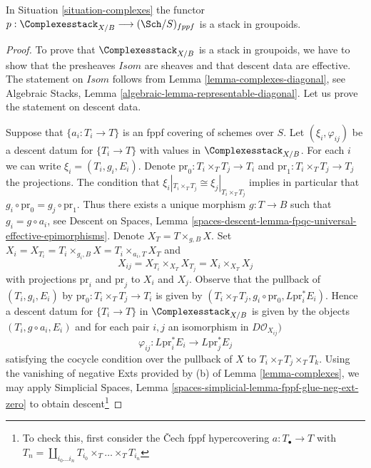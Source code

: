 \begin{lemma}
\label{lemma-complexes-stack}
In Situation \ref{situation-complexes} the functor
$p : \Complexesstack_{X/B} \longrightarrow (\Sch/S)_{fppf}$
is a stack in groupoids.
\end{lemma}

\begin{proof}
To prove that $\Complexesstack_{X/B}$ is a stack in groupoids,
we have to show that the presheaves $\mathit{Isom}$ are sheaves
and that descent data are effective. The statement on
$\mathit{Isom}$ follows from Lemma \ref{lemma-complexes-diagonal}, see
Algebraic Stacks, Lemma \ref{algebraic-lemma-representable-diagonal}.
Let us prove the statement on descent data.

\medskip\noindent
Suppose that $\{a_i : T_i \to T\}$ is an fppf covering of schemes over $S$.
Let $(\xi_i, \varphi_{ij})$ be a descent datum for $\{T_i \to T\}$
with values in $\Complexesstack_{X/B}$.
For each $i$ we can write $\xi_i = (T_i, g_i, E_i)$.
Denote $\text{pr}_0 : T_i \times_T T_j \to T_i$ and
$\text{pr}_1 : T_i \times_T T_j \to T_j$ the projections.
The condition that $\xi_i|_{T_i \times_T T_j} \cong \xi_j|_{T_i \times_T T_j}$
implies in particular that $g_i \circ \text{pr}_0 = g_j \circ \text{pr}_1$.
Thus there exists a unique morphism $g : T \to B$ such that
$g_i = g \circ a_i$, see
Descent on Spaces, Lemma
\ref{spaces-descent-lemma-fpqc-universal-effective-epimorphisms}.
Denote $X_T = T \times_{g, B} X$. Set
$X_i = X_{T_i} = T_i \times_{g_i, B} X = T_i \times_{a_i, T} X_T$
and
$$
X_{ij} = X_{T_i} \times_{X_T} X_{T_j} = X_i \times_{X_T} X_j
$$
with projections $\text{pr}_i$ and $\text{pr}_j$ to $X_i$ and $X_j$.
Observe that the pullback of $(T_i, g_i, E_i)$
by $\text{pr}_0 : T_i \times_T T_j \to T_i$ is given by
$(T_i \times_T T_j, g_i \circ \text{pr}_0, L\text{pr}_i^*E_i)$.
Hence a descent datum for $\{T_i \to T\}$ in $\Complexesstack_{X/B}$
is given by the objects $(T_i, g \circ a_i, E_i)$
and for each pair $i, j$ an isomorphism in
$D\mathcal{O}_{X_{ij}})$
$$
\varphi_{ij} :
L\text{pr}_i^*E_i \longrightarrow L\text{pr}_j^*E_j
$$
satisfying the cocycle condition over the pullback of $X$ to
$T_i \times_T T_j \times_T T_k$.
Using the vanishing of negative Exts provided by (b) of
Lemma \ref{lemma-complexes}, we may apply
Simplicial Spaces, Lemma \ref{spaces-simplicial-lemma-fppf-glue-neg-ext-zero}
to obtain descent\footnote{To check this, first consider the
{\v C}ech fppf hypercovering $a : T_\bullet \to T$ with
$T_n = \coprod_{i_0 \ldots i_n} T_{i_0} \times_T \ldots \times_T T_{i_n}$
}
\end{proof}
